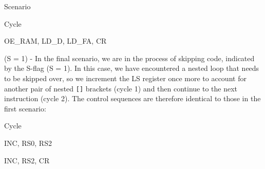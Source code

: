 \begin{labeledenum}{Scenario}
    \begin{labeledenum}{Cycle}
    \item OE\_RAM, LD\_D, LD\_FA, CR
    \end{labeledenum}
    
  \item (S = 1) - In the final scenario, we are in the process of skipping code, indicated by the S-flag (S = 1). In this case, we have encountered a nested loop that needs to be skipped over, so we increment the LS register once more to account for another pair of nested \texttt{[]} brackets (cycle 1) and then continue to the next instruction (cycle 2). The control sequences are therefore identical to those in the first scenario:
    
    \begin{labeledenum}{Cycle}
    \item INC, RS0, RS2
    \item INC, RS2, CR
    \end{labeledenum}

\end{labeledenum}


